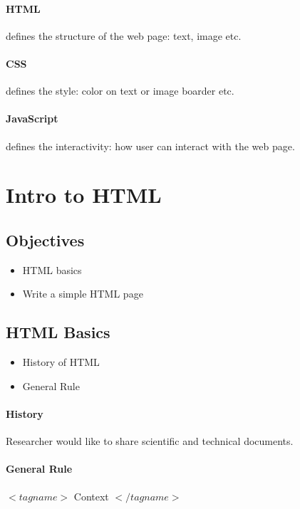 \documentclass{article}
\begin{document}
\paragraph{HTML} defines the structure of the web page: text, image etc.

\paragraph{CSS} defines the style: color on text or image boarder etc.

\paragraph{JavaScript} defines the interactivity: how user can interact with the web page.

\newpage

\section{Intro to HTML}
\subsection*{Objectives}
\begin{itemize}
	\item HTML basics
	\item Write a simple HTML page
\end{itemize}

\subsection{HTML Basics}
\begin{itemize}
	\item History of HTML
	\item General Rule
\end{itemize}

\paragraph{History} Researcher would like to share scientific and technical documents.

\paragraph{General Rule}
$<tagname>$  Context  $</tagname>$
\end{document}
